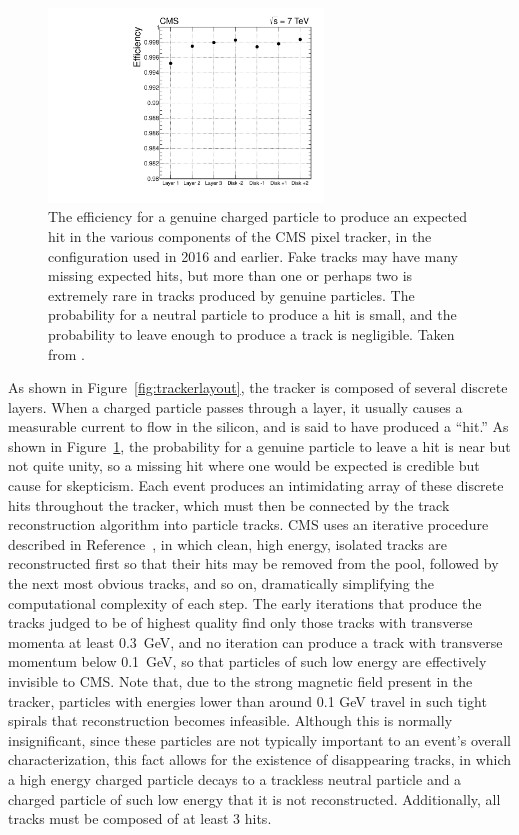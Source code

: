   \begin{figure}[h!]
    \centering
    \includegraphics[width=0.65\textwidth]{figures/hitefficiency.pdf}
    \caption[Efficiency for a genuine particle to leave an expected hit in the CMS tracker.]{
      The efficiency for a genuine charged particle to produce an expected hit in the various components of the CMS pixel tracker, in the configuration used in 2016 and earlier. 
      Fake tracks may have many missing expected hits, but more than one or perhaps two is extremely rare in tracks produced by genuine particles.
      The probability for a neutral particle to produce a hit is small, and the probability to leave enough to produce a track is negligible.
      Taken from \cite{cmstracking}.}
    \label{fig:hitefficiency}
  \end{figure}  

  As shown in Figure~\ref{fig:trackerlayout}, the tracker is composed of several discrete layers.
  When a charged particle passes through a layer, it usually causes a measurable current to flow in the silicon, and is said to have produced a ``hit.''  
  As shown in Figure~\ref{fig:hitefficiency}, the probability for a genuine particle to leave a hit is near but not quite unity, so a missing hit where one would be expected is credible but cause for skepticism.
  Each event produces an intimidating array of these discrete hits throughout the tracker, which must then be connected by the track reconstruction algorithm into particle tracks.
  CMS uses an iterative procedure described in Reference~\cite{cmstracking}, in which clean, high energy, isolated tracks are reconstructed first so that their hits may be removed from the pool, followed by the next most obvious tracks, and so on, dramatically simplifying the computational complexity of each step.
  The early iterations that produce the tracks judged to be of highest quality find only those tracks with transverse momenta at least 0.3~GeV, and no iteration can produce a track with transverse momentum below 0.1~GeV, so that particles of such low energy are effectively invisible to CMS.
  Note that, due to the strong magnetic field present in the tracker, particles with energies lower than around 0.1 GeV travel in such tight spirals that reconstruction becomes infeasible.
  Although this is normally insignificant, since these particles are not typically important to an event's overall characterization, this fact allows for the existence of disappearing tracks, in which a high energy charged particle decays to a trackless neutral particle and a charged particle of such low energy that it is not reconstructed.
  Additionally, all tracks must be composed of at least 3 hits.

